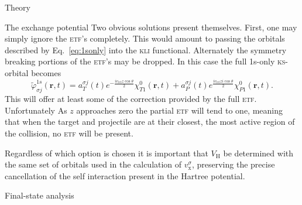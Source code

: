\documentclass[aps, pra, reprint, groupedaddress, amsfonts,
               amsmath, amssymb, showpacs, nofootinbib]{revtex4-1}
\begin{document}
\begin{section}{Theory \label{sec:theory}}
\begin{subsection}{The exchange potential \label{sec:xpot}}
      Two obvious solutions present themselves. First, one may simply ignore the \textsc{etf}'s
      completely. This would amount to passing the orbitals described by Eq.~\eqref{eq:1sonly} into
      the \textsc{kli} functional. Alternately the symmetry breaking portions of the \textsc{etf}'s
      may be dropped. In this case the full 1s-only \textsc{ks}-orbital becomes
      \begin{equation} \label{eq:1sonlyetf}
         \tilde{\varphi}_{\sigma j}^{1s} (\mathbf{r},t) =
                       a^{\sigma j}_T (t)  e^{- \frac{i v_\mathrm{rel} z \cos \theta}{2}}
                                           \chi^{0}_{T1} (\mathbf{r},t)
                     + a^{\sigma j}_P (t)  e^{\frac{i v_\mathrm{rel} z i \cos \theta}{2}}
                                           \chi^{0}_{P1} (\mathbf{r},t).
      \end{equation}
      This will offer at least some of the correction provided by the full \textsc{etf}. Unfortunately
      As $z$ approaches zero the partial \textsc{etf} will tend to one, meaning that when the target and
      projectile are at their closest, the most active region of the collision, no \textsc{etf} will be
      present. 
      
      Regardless of which option is chosen it is important that $V_\mathrm{H}$ be determined with the
      same set of orbitals used in the calculation of $v_\mathrm{x}^\sigma$, preserving the precise
      cancellation of the self interaction present in the Hartree potential.

   \end{subsection}

   \begin{subsection}{Final-state analysis \label{sec:probs}}


\end{subsection}
\end{section}
\end{document}
